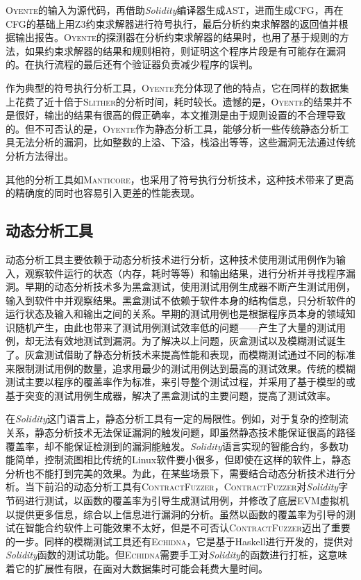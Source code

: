 \textsc{Oyente}的输入为源代码，再借助\emph{Solidity}编译器生成AST，进而生成CFG，再在CFG的基础上用Z3约束求解器进行符号执行，最后分析约束求解器的返回值并根据输出报告。\textsc{Oyente}的探测器在分析约束求解器的结果时，也用了基于规则的方法，如果约束求解器的结果和规则相符，则证明这个程序片段是有可能存在漏洞的。在执行流程的最后还有个验证器负责减少程序的误判。

作为典型的符号执行分析工具，\textsc{Oyente}充分体现了他的特点，它在同样的数据集上花费了近十倍于\textsc{Slither}的分析时间，耗时较长。遗憾的是，\textsc{Oyente}的结果并不是很好，输出的结果有很高的假正确率，本文推测是由于规则设置的不合理导致的。但不可否认的是，\textsc{Oyente}作为静态分析工具，能够分析一些传统静态分析工具无法分析的漏洞，比如整数的上溢、下溢，栈溢出等等，这些漏洞无法通过传统分析方法得出。

其他的分析工具如\textsc{Manticore}，也采用了符号执行分析技术，这种技术带来了更高的精确度的同时也容易引入更差的性能表现。

\subsection{动态分析工具}

动态分析工具主要依赖于动态分析技术进行分析，这种技术使用测试用例作为输入，观察软件运行的状态（内存，耗时等等）和输出结果，进行分析并寻找程序漏洞。早期的动态分析技术多为黑盒测试，使用测试用例生成器不断产生测试用例，输入到软件中并观察结果。黑盒测试不依赖于软件本身的结构信息，只分析软件的运行状态及输入和输出之间的关系。早期的测试用例也是根据程序员本身的领域知识随机产生，由此也带来了测试用例测试效率低的问题——产生了大量的测试用例，却无法有效地测试到漏洞。为了解决以上问题，灰盒测试以及模糊测试诞生了。灰盒测试借助了静态分析技术来提高性能和表现，而模糊测试通过不同的标准来限制测试用例的数量，追求用最少的测试用例达到最高的测试效果。传统的模糊测试主要以程序的覆盖率作为标准，来引导整个测试过程，并采用了基于模型的或基于突变的测试用例生成器，解决了黑盒测试的主要问题，提高了测试效率。

在\emph{Solidity}这门语言上，静态分析工具有一定的局限性。例如，对于复杂的控制流关系，静态分析技术无法保证漏洞的触发问题，即虽然静态技术能保证很高的路径覆盖率，却不能保证检测到的漏洞能触发。\emph{Solidity}语言实现的智能合约，多数功能简单，控制流图相比传统的Linux软件要小很多，但即使在这样的软件上，静态分析也不能打到完美的效果。为此，在某些场景下，需要结合动态分析技术进行分析。当下前沿的动态分析工具有\textsc{ContractFuzzer}，\textsc{ContractFuzzer}对\emph{Solidity}字节码进行测试，以函数的覆盖率为引导生成测试用例，并修改了底层EVM虚拟机以提供更多信息，综合以上信息进行漏洞的分析。虽然以函数的覆盖率为引导的测试在智能合约软件上可能效果不太好，但是不可否认\textsc{ContractFuzzer}迈出了重要的一步。同样的模糊测试工具还有\textsc{Echidna}，它是基于Haskell进行开发的，提供对\emph{Solidity}函数的测试功能。但\textsc{Echidna}需要手工对\emph{Solidity}的函数进行打桩，这意味着它的扩展性有限，在面对大数据集时可能会耗费大量时间。

